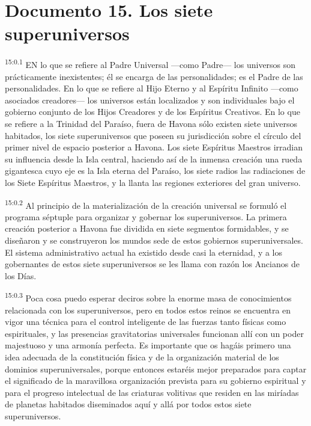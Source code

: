 \chapter{Documento 15. Los siete superuniversos}
\par
\textsuperscript{15:0.1} EN lo que se refiere al Padre Universal ---como Padre--- los universos son prácticamente inexistentes; él se encarga de las personalidades; es el Padre de las personalidades. En lo que se refiere al Hijo Eterno y al Espíritu Infinito ---como asociados creadores--- los universos están localizados y son individuales bajo el gobierno conjunto de los Hijos Creadores y de los Espíritus Creativos. En lo que se refiere a la Trinidad del Paraíso, fuera de Havona sólo existen siete universos habitados, los siete superuniversos que poseen su jurisdicción sobre el círculo del primer nivel de espacio posterior a Havona. Los siete Espíritus Maestros irradian su influencia desde la Isla central, haciendo así de la inmensa creación una rueda gigantesca cuyo eje es la Isla eterna del Paraíso, los siete radios las radiaciones de los Siete Espíritus Maestros, y la llanta las regiones exteriores del gran universo.

\par
\textsuperscript{15:0.2} Al principio de la materialización de la creación universal se formuló el programa séptuple para organizar y gobernar los superuniversos. La primera creación posterior a Havona fue dividida en siete segmentos formidables, y se diseñaron y se construyeron los mundos sede de estos gobiernos superuniversales. El sistema administrativo actual ha existido desde casi la eternidad, y a los gobernantes de estos siete superuniversos se les llama con razón los Ancianos de los Días.

\par
\textsuperscript{15:0.3} Poca cosa puedo esperar deciros sobre la enorme masa de conocimientos relacionada con los superuniversos, pero en todos estos reinos se encuentra en vigor una técnica para el control inteligente de las fuerzas tanto físicas como espirituales, y las presencias gravitatorias universales funcionan allí con un poder majestuoso y una armonía perfecta. Es importante que os hagáis primero una idea adecuada de la constitución física y de la organización material de los dominios superuniversales, porque entonces estaréis mejor preparados para captar el significado de la maravillosa organización prevista para su gobierno espiritual y para el progreso intelectual de las criaturas volitivas que residen en las miríadas de planetas habitados diseminados aquí y allá por todos estos siete superuniversos.

